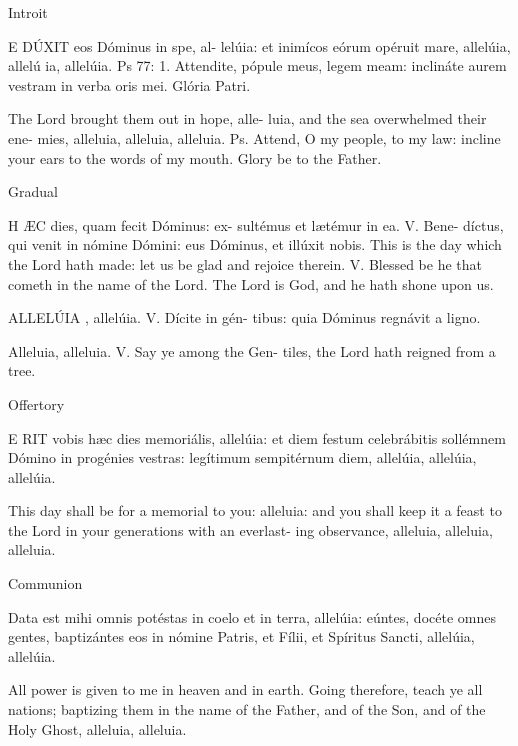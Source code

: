 Introit

E
DÚXIT
  eos  Dóminus  in  spe,  al-
lelúia:   et   inimícos   eórum   opéruit   
mare, allelúia, allelú
ia, allelúia. Ps 77: 
1.  Attendite,  pópule  meus,  legem  
meam:  inclináte  aurem  vestram  in  
verba oris mei. Glória Patri. 

The  Lord  brought  them  out  in  hope,  alle-
luia,  and  the  sea  overwhelmed  their  ene-
mies,  alleluia,  alleluia,  alleluia.  Ps.  Attend,  
O  my  people,  to  my  law:  incline  your  ears  
to the words of my mouth. Glory be to the Father.



Gradual

H
ÆC
 dies, quam fecit Dóminus: ex-
sultémus  et  lætémur  in  ea.  V.  Bene-
díctus, qui venit in nómine Dómini: 
eus Dóminus, et illúxit nobis. 
This is the day which the Lord hath made: 
let   us   be   glad   and   rejoice   therein.   V.      
Blessed  be  he  that  cometh  in  the  name  of  
the  Lord.  The  Lord  is  God,  and  he  hath  
shone upon us.

ALLELÚIA
, allelúia. V. Dícite in gén-
tibus:   quia   Dóminus   regnávit   a   
ligno. 

Alleluia, alleluia. V. Say ye among the Gen-
tiles, the Lord hath reigned from a tree. 



Offertory

E
RIT
   vobis   hæc   dies   memoriális,   
allelúia:  et  diem  festum  celebrábitis  
sollémnem   Dómino   in   progénies   
vestras:    legítimum    sempitérnum    
diem, allelúia, allelúia, allelúia.

This  day  shall  be  for  a  memorial  to  you:  
alleluia: and you shall keep it a feast to the 
Lord  in  your  generations  with  an  everlast-
ing observance, alleluia, alleluia, alleluia.


Communion

Data est  mihi  omnis  potéstas  in  
coelo et in terra, allelúia: eúntes, docéte  omnes  gentes,  baptizántes  eos  
in  nómine  Patris,  et  Fílii,  et  Spíritus  
Sancti, allelúia, allelúia. 

All power is given to me in heaven and in 
earth. Going therefore, teach ye all nations; 
baptizing  them  in  the  name  of  the  Father,  
and  of  the  Son,  and  of  the  Holy  Ghost,  
alleluia, alleluia. 

